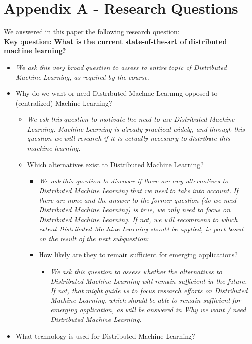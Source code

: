 \section{Appendix A - Research Questions}
We answered in this paper the following research question:\\
\textbf{Key question: What is the current state-of-the-art of distributed machine learning?}
\begin{itemize}
	\item \textit{We ask this very broad question to assess to entire topic of Distributed Machine Learning, as required by the course.}
	\item Why do we want or need Distributed Machine Learning opposed to (centralized) Machine Learning?
	\begin{itemize}
		\item \textit{We ask this question to motivate the need to use Distributed Machine Learning. Machine Learning is already practiced widely, and through this question we will research if it is actually necessary to distribute this machine learning.}
		\item Which alternatives exist to Distributed Machine Learning?
		\begin{itemize}
			\item \textit{We ask this question to discover if there are any alternatives to Distributed Machine Learning that we need to take into account. If there are none and the answer to the former question (do we need Distributed Machine Learning) is true, we only need to focus on Distributed Machine Learning. If not, we will recommend to which extent Distributed Machine Learning should be applied, in part based on the result of the next subquestion:}
			\item How likely are they to remain sufficient for emerging applications?
			\begin{itemize}
				\item \textit{We ask this question to assess whether the alternatives to Distributed Machine Learning will remain sufficient in the future. If not, that might guide us to focus research efforts on Distributed Machine Learning, which should be able to remain sufficient for emerging application, as will be answered in Why we want / need Distributed Machine Learning.}
			\end{itemize}
		\end{itemize}
	\end{itemize}
	\item What technology is used for Distributed Machine Learning?

\end{itemize}
